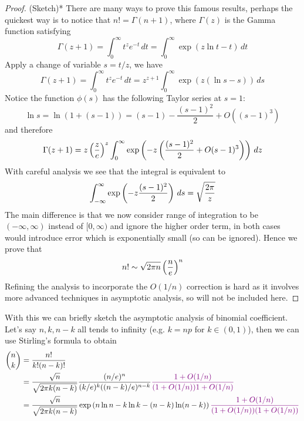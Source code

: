 \begin{unexaminable}
\begin{proof} (Sketch)* There are many ways to prove this famous results, perhaps the quickest way is to notice that $n! = \Gamma(n+1)$, where $\Gamma(z)$ is the Gamma function satisfying
\begin{equation}
    \Gamma(z+1) = \int_0^\infty t^z e^{-t} \, dt = \int_0^\infty \exp(z \ln t - t) \, dt
\end{equation}
Apply a change of variable $s = t/z$, we have
\begin{equation}
    \Gamma(z+1) = \int_0^\infty t^z e^{-t} \, dt = z^{z+1}\int_0^\infty \exp(z(\ln s - s)) \, ds
\end{equation}
Notice the function $\phi(s)$ has the following Taylor series at $s = 1$:
\begin{equation}
    \ln s = \ln (1+(s-1)) = (s - 1) - \frac{(s-1)^2}{2} + O((s-1)^3)
\end{equation}
and therefore
\begin{equation}
    \Gamma(z+1) = z\left( \frac{z}{e} \right)^z \int_0^\infty \exp\left( -z \left( \frac{(s-1)^2}{2} + O(s-1)^3 \right) \right) \, dz
\end{equation}
With careful analysis we see that the integral is equivalent to 
\begin{equation}
    \int_{-\infty}^\infty \exp\left( -z\frac{(s-1)^2}{2} \right) \, ds = \sqrt{\frac{2\pi}{z}}
\end{equation}
The main difference is that we now consider range of integration to be $(-\infty, \infty)$ instead of $[0,\infty)$ and ignore the higher order term, in both cases would introduce error which is exponentially small (so can be ignored). Hence we prove that
\begin{equation}
    n! \sim \sqrt{2\pi n} \left( \frac{n}{e} \right)^n
\end{equation}
Refining the analysis to incorporate the $O(1/n)$ correction is hard as it involves more advanced techniques in asymptotic analysis, so will not be included here.
\end{proof}
\end{unexaminable}

With this we can briefly sketch the asymptotic analysis of binomial coefficient. Let's say $n,k,n-k$ all tends to infinity (e.g. $k = np$ for $k \in (0,1)$), then we can use Stirling's formula to obtain
\begin{align*}
    {n\choose k} &= \frac{n!}{k! (n-k)!} \\
    &= \frac{\sqrt{n}}{\sqrt{2\pi k(n-k)}} \frac{(n/e)^n}{(k/e)^k ((n-k)/e)^{n-k}} \textcolor{violet}{\frac{1+O(1/n)}{(1+O(1/n))1+O(1/n)}}\\
    &= \frac{\sqrt{n}}{\sqrt{2\pi k(n-k)}}  \exp\left( n \ln n - k \ln k - (n-k) \ln (n-k) \right)\textcolor{violet}{\frac{1+O(1/n)}{(1+O(1/n))(1+O(1/n))}}
\end{align*}

